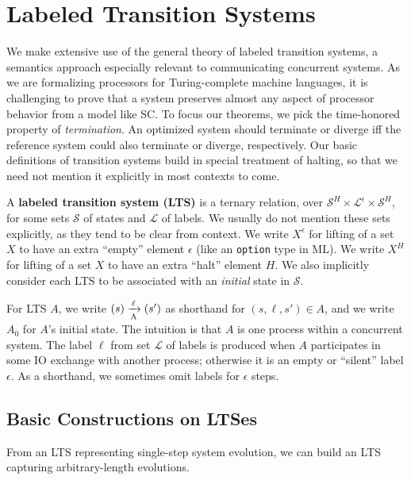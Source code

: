 \section{Labeled Transition Systems}\label{sec:lts}

We make extensive use of the general theory of labeled transition
systems, a semantics approach especially relevant to communicating
concurrent systems.  As we are formalizing processors for
Turing-complete machine languages, it is challenging to prove that a
system preserves almost any aspect of processor behavior from a model
like SC.  To focus our theorems, we pick the time-honored property of
\emph{termination}.  An optimized system should terminate or diverge
iff the reference system could also terminate or diverge,
respectively.  Our basic definitions of transition systems build in
special treatment of halting, so that we need not mention it
explicitly in most contexts to come.

\begin{defn}
A \textbf{labeled transition system (LTS)} is a ternary relation, over
$\mathcal S^H \times \mathcal L^\epsilon \times \mathcal S^H$, for some sets
$\mathcal S$ of states and $\mathcal L$ of labels. We usually do not mention
these sets explicitly, as they tend to be clear from context. We write
$X^\epsilon$ for lifting of a set $X$ to have an extra ``empty'' element
$\epsilon$ (like an \texttt{option} type in ML). We write $X^H$ for lifting of
a set $X$ to have an extra ``halt'' element $H$. We also implicitly consider
each LTS to be associated with an \emph{initial} state in $\mathcal S$.
\end{defn}

For LTS $A$, we write $\io{A}{s}{s'}{\ell}$ as shorthand for $(s,
\ell, s') \in A$, and we write $A_0$ for $A$'s initial state. The
intuition is that $A$ is one process within a concurrent system. The
label $\ell$ from set $\mathcal L$ of labels is produced when $A$
participates in some IO exchange with another process; otherwise it is
an empty or ``silent'' label $\epsilon$.  As a shorthand, we sometimes
omit labels for $\epsilon$ steps.

\subsection{Basic Constructions on LTSes}

From an LTS representing single-step system evolution, we can build %
an LTS capturing arbitrary-length evolutions.

